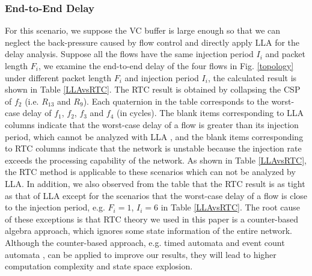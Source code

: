 \documentclass[10pt,journal]{IEEEtran}
\begin{document}
\subsubsection{End-to-End Delay}
For this scenario, we suppose the VC buffer is large enough so that we can neglect the back-pressure caused by flow control and directly apply LLA for the delay analysis. Suppose all the flows have the same injection period $I_i$ and packet length $F_i$, we examine the end-to-end delay of the four flows in Fig. \ref{topology} under different packet length $F_i$ and injection period $I_i$, the calculated result is shown in Table \ref{LLAvsRTC}. The RTC result is obtained by collapsing the CSP of $f_2$ (i.e. $R_{13}$ and $R_{9}$). Each quaternion in the table corresponds to the worst-case delay of $f_1$, $f_2$, $f_3$ and $f_4$ (in cycles). The blank items corresponding to LLA columns indicate that the worst-case delay of a flow is greater than its injection period, which cannot be analyzed with LLA \cite{73}\cite{189}, and the blank items corresponding to RTC columns indicate that the network is unstable because the injection rate exceeds the processing capability of the network. As shown in Table \ref{LLAvsRTC}, the RTC method is applicable to these scenarios which can not be analyzed by LLA. In addition, we also observed from the table that the RTC result is as tight as that of LLA except for the scenarios that the worst-case delay of a flow is close to the injection period, e.g. $F_i=1$, $I_i=6$ in Table \ref{LLAvsRTC}. The root cause of these exceptions is that RTC theory we used in this paper is a counter-based algebra approach, which ignores some state information of the entire network. Although the counter-based approach, e.g. timed automata \cite{Fersman2006301} and event count automata \cite{Chakraborty:2005:ECA:1106608.1106642}, can be applied to improve our results, they will lead to higher computation complexity and state space explosion.
\end{document}
